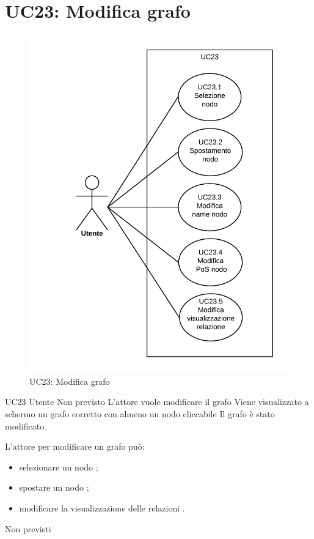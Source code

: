 \documentclass[../AnalisideiRequisiti.tex]{subfiles}
\begin{document}
\section{UC23: Modifica grafo}
\begin{figure}[H]
	\centering
	\includegraphics[width=\textwidth]{../img/UC23.png}
	\caption{UC23: Modifica grafo}
\end{figure}
\UserCase
{UC23}
{Utente}
{Non previsto}
{L'attore vuole modificare il grafo}
{Viene visualizzato a schermo un grafo corretto con almeno un nodo cliccabile }
{Il grafo è stato modificato}
{
	L'attore per modificare un grafo può:
	\begin{itemize}
		\item{} selezionare un nodo ;
		\item{} spostare un nodo ;	
		\item{} modificare la visualizzazione delle relazioni .		
	\end{itemize}
}
{Non previsti}
\end{document}
